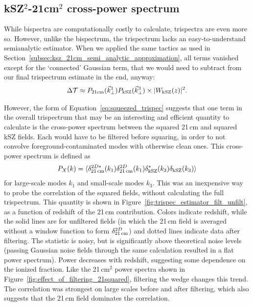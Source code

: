 \subsection{kSZ$^2$-21cm$^2$ cross-power spectrum}

While bispectra are computationally costly to calculate, trispectra are even more so. However, unlike the bispectrum, the trispectrum lacks an easy-to-understand semianalytic estimator. When we applied the same tactics as used in Section~\ref{subsec:ksz_21cm_semi_analytic_approximation}, all terms vanished except for the `connected' Gaussian term, that we would need to subtract from our final trispectrum estimate in the end, anyway:
\begin{equation}
\Delta\mathcal{T} \approx P_{\rm 21cm}(\vec{k}^1_{\perp})P_{\rm kSZ}(\vec{k}^3_{\perp}) \times |W_{\rm kSZ}(z)|^2.
\end{equation}

However, the form of Equation~\ref{eq:squeezed_trispec} suggests that one term in the overall trispectrum that may be an interesting and efficient quantity to calculate is the cross-power spectrum between the squared 21\,cm and squared kSZ fields. Each would have to be filtered before squaring, in order to not convolve foreground-contaminated modes with otherwise clean ones. This cross-power spectrum is defined as
\begin{equation}
P_X(k) = \langle \delta^{2D*}_{\rm 21\,cm}(k_1)\delta^{2D}_{\rm 21\,cm}(k_1) \delta^*_{\rm kSZ}(k_3) \delta_{\rm kSZ}(k_3) \rangle
\end{equation}
for large-scale modes $k_1$ and small-scale modes $k_3$. This was an inexpensive way to probe the correlation of the squared fields, without calculating the full trispectrum. This quantity is shown in Figure~\ref{fig:trispec_estimator_filt_unfilt}, as a function of redshift of the 21\,cm contribution. Colors indicate redshift, while the solid lines are for unfiltered fields (in which the 21\,cm field is averaged without a window function to form $\delta^{2D}_{\rm 21\,cm}$) and dotted lines indicate data after filtering. The statistic is noisy, but is significantly above theoretical noise levels (passing Gaussian noise fields through the same calculation resulted in a flat power spectrum). Power decreases with redshift, suggesting some dependence on the ionized fraction. Like the 21\,cm$^2$ power spectra shown in Figure~\ref{fig:effect_of_filtering_21squared}, filtering the wedge changes this trend. The correlation was strongest on large scales before and after filtering, which also suggests that the 21\,cm field dominates the correlation.

